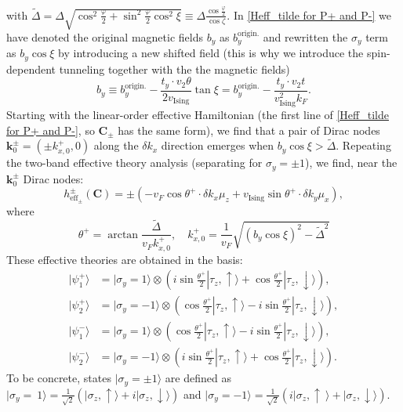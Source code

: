 \begin{subappendices}
			with $\widetilde\Delta=\Delta\sqrt{\cos^2\frac{\varphi}{2}+\sin^2\frac{\varphi}{2}\cos^2\xi}\equiv\Delta\frac{\cos\frac{\varphi}{2}}{\cos\zeta}$. In \eqref{Heff_tilde for P+ and P-} we have denoted the original magnetic fields $b_y$ as $b_y^{\text{origin.}}$ and rewritten the $\sigma_y$ term as $b_y\cos\xi$ by introducing a new shifted field (this is why we introduce the spin-dependent tunneling together with the the magnetic fields)
			\begin{equation*}
				b_y\equiv b_y^{\text{origin.}}-\frac{t_y\cdot v_2\theta}{2v_{\text{Ising}}}\tan\xi=b_y^{\text{origin.}}-\frac{t_y\cdot v_2 t}{v_{\text{Ising}}^2 k_F}.
			\end{equation*}
			\indent Starting with the linear-order effective Hamiltonian (the first line of \eqref{Heff_tilde for P+ and P-}, so $\bm{C}_\pm$ has the same form), we find that a pair of Dirac nodes $\bm{k}^\pm_0=(\pm k^+_{x,0},0)$ along the $\delta k_x$ direction emerges when $b_y\cos\xi>\widetilde\Delta$. Repeating the two-band effective theory analysis (separating for $\sigma_y=\pm1$), we find, near the $\bm{k}_0^\pm$ Dirac nodes:
			\begin{equation}\label{heff for P+ and P-}
				h^\pm_{\text{eff}_\pm}(\bm{C})=\pm(-v_F\cos\theta^+\cdot\delta k_x\mu_z+v_{\text{Ising}}\sin\theta^+\cdot\delta k_y\mu_x),
			\end{equation}
			where
			\begin{equation*}
				\theta^+=\arctan\frac{\widetilde\Delta}{v_F k^+_{x,0}},\quad k^+_{x,0}=\frac{1}{v_F}\sqrt{(b_y\cos\xi)^2-\widetilde\Delta^2}
			\end{equation*}
			These effective theories are obtained in the basis:
			\begin{align*}
				|\psi^+_1\rangle&=|\sigma_y=1\rangle\otimes (i\sin\frac{\theta^+}{2}|\tau_z,\uparrow\rangle+\cos\frac{\theta^+}{2}|\tau_z,\downarrow\rangle),\\
				|\psi^+_2\rangle&=|\sigma_y=-1\rangle\otimes (\cos\frac{\theta^+}{2}|\tau_z,\uparrow\rangle-i\sin\frac{\theta^+}{2}|\tau_z,\downarrow\rangle),\\
				|\psi^-_1\rangle&=|\sigma_y=1\rangle\otimes(\cos\frac{\theta^+}{2}|\tau_z,\uparrow\rangle-i\sin\frac{\theta^+}{2}|\tau_z,\downarrow\rangle),\\
				|\psi^-_2\rangle&=|\sigma_y=-1\rangle\otimes (i\sin\frac{\theta^+}{2}|\tau_z,\uparrow\rangle+\cos\frac{\theta^+}{2}|\tau_z,\downarrow\rangle).
			\end{align*}
			To be concrete, states $|\sigma_y=\pm 1\rangle$ are defined as $|\sigma_y=~1\rangle=\frac{1}{\sqrt{2}}(|\sigma_z,\uparrow\rangle+i|\sigma_z,\downarrow\rangle)$ and $|\sigma_y=-1\rangle=\frac{1}{\sqrt{2}}(i|\sigma_z,\uparrow~\rangle+|\sigma_z,\downarrow\rangle)$.\par

\end{subappendices}
